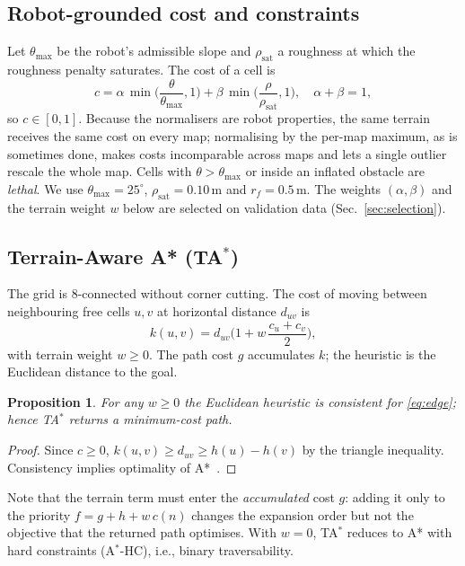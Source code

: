 \documentclass[conference]{IEEEtran}
\newtheorem{proposition}{Proposition}
\newcommand{\TA}{TA$^*$}
\newcommand{\HC}{A$^*$-HC}
\newcommand{\thmax}{\theta_{\max}}
\begin{document}
\subsection{Robot-grounded cost and constraints}
Let $\thmax$ be the robot's admissible slope and $\rho_{\mathrm{sat}}$ a
roughness at which the roughness penalty saturates. The cost of a cell is
\begin{equation}
c = \alpha\,\min\!\Big(\frac{\theta}{\thmax},1\Big) + \beta\,\min\!\Big(\frac{\rho}{\rho_{\mathrm{sat}}},1\Big),\quad \alpha+\beta=1,
\label{eq:cost}
\end{equation}
so $c\in[0,1]$. Because the normalisers are robot properties, the same terrain
receives the same cost on every map; normalising by the per-map maximum, as
is sometimes done, makes costs incomparable across maps and lets a single
outlier rescale the whole map. Cells with $\theta>\thmax$ or inside an
inflated obstacle are \emph{lethal}. We use $\thmax=25^\circ$,
$\rho_{\mathrm{sat}}=0.10$\,m and $r_f=0.5$\,m. The weights
$(\alpha,\beta)$ and the terrain weight $w$ below are selected on validation
data (Sec.~\ref{sec:selection}).

\subsection{Terrain-Aware A* (\TA)}
The grid is 8-connected without corner cutting. The cost of moving between
neighbouring free cells $u,v$ at horizontal distance $d_{uv}$ is
\begin{equation}
k(u,v) = d_{uv}\Big(1 + w\,\frac{c_u + c_v}{2}\Big),
\label{eq:edge}
\end{equation}
with terrain weight $w\ge 0$. The path cost $g$ accumulates $k$; the
heuristic is the Euclidean distance to the goal.
\begin{proposition}
For any $w\ge 0$ the Euclidean heuristic is consistent for \eqref{eq:edge};
hence \TA{} returns a minimum-cost path.
\end{proposition}
\begin{proof}
Since $c\ge 0$, $k(u,v)\ge d_{uv}\ge h(u)-h(v)$ by the triangle inequality.
Consistency implies optimality of A*~\cite{hart1968astar}.
\end{proof}
Note that the terrain term must enter the \emph{accumulated} cost $g$: adding
it only to the priority $f=g+h+w\,c(n)$ changes the expansion order but not
the objective that the returned path optimises. With $w=0$, \TA{} reduces to A*
with hard constraints (\HC), i.e., binary traversability.
\end{document}
